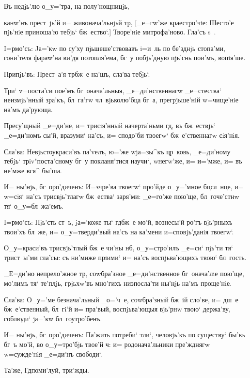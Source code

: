 Въ недjь'лю о_у='тра, на полу'нощницjь,

канw'нъ прест~jь'й и= живонача'льнjьй тр, 
[_е=гw'же краестро'чiе: Шесто'е пjь'нiе приноша'ю тебjь` 
бж~ество`.] Творе'нiе митрофа'ново. Гла'съ s~.


I=рмо'съ: Jа='кw по су'ху пjьшеше'ствовавъ i=и~ль по 
бе'зднjь стопа'ми, гони'теля фараw'на ви'дя потопля'ема, 
бг~у побjь'дную пjь'снь пои'мъ, вопiя'ше.

Припjь'въ: Прест~а'я тр бж~е на'шъ, сла'ва тебjь`. 

Три` v=поста'си пое'мъ бг~онача'льныя, 
_е=ди'нственнагw _е=стества` неизмjь'нный зра'къ, 
бл~га'гw чл~вjьколю'бца бг~а, прегрjьше'нiй w=чище'нiе 
на'мъ да'рующа.

Пресу'щный _е=ди'не, и= трисiя'нный начерта'ньми 
гд, въ бж~ествjь` _е=ди'номъ сы'й, вразуми` на'съ, и= 
сподо'би твоегw` бж~е'ственнагw сiя'нiя.

Сла'ва: Невjьстоукраси'въ па'vелъ, ю='же w\т jа=зы^къ 
цр~ковь, _е=ди'ному тебjь` трiv"поста'сному бг~у 
покланя'тися научи`, w\т негw'же, и= и='мже, и= въ не'мже 
вся^ бы'ша.

И= ны'нjь, бг~оро'диченъ: И=з\ъ чре'ва твоегw` про'йде 
о_у='мное бц сл~нце, и= w=сiя` на'съ трисвjь'тлагw 
бж~ества` заря'ми: _е=го'же пою'ще, бл~гоче'стнw тя` 
о_у=бл~жа'емъ.


I=рмо'съ: Нjь'сть ст~ъ, jа='коже ты` гд бж~е мо'й, 
вознесы'й ро'гъ вjь'рныхъ твои'хъ бл~же, и= 
о_у=тверди'вый на'съ на ка'мени и=сповjь'данiя твоегw`.

О_у=краси'въ трисвjь'тлый бж~е чи'ны нб, 
о_у=стро'илъ _е=си` пjь'ти тя` трист~ы'ми гла'сы: съ 
ни'миже прiими` и= на'съ воспjьва'ющихъ твою` бл~гость. 

_Е=ди'но непрело'жное тр, соwбра'зное 
_е=ди'нственное бг~онача'лiе пою'ще, мо'лимъ тя` те'плjь, 
грjьхw'въ мно'гихъ низпосла'ти ны'нjь на'мъ проще'нiе.

Сла'ва: О_у='ме безнача'льный _о='ч~е, соwбра'зный 
бж~iй сло'ве, и= дш~е бж~е'ственный, бл~гi'й и= пра'вый, 
воспjьва'ющыя вjь'рнw твою` держа'ву, соблюди` jа='кw 
бл~гоутро'бенъ.

И= ны'нjь, бг~оро'диченъ: Па'жить потреби` тли`, 
человjь'къ по существу` бы'въ бг~ъ мо'й, во о_у=тро'бjь 
твое'й ч: и= родонача'льники пре'жднягw w=сужде'нiя 
_е=ди'нъ свободи`. 

Та'же, Гд поми'луй, три'жды. 

